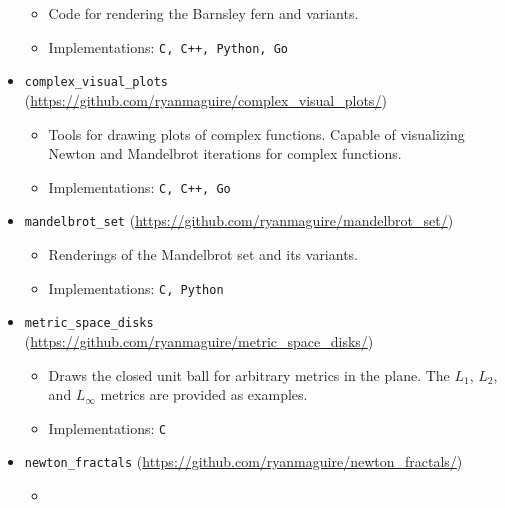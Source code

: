 \documentclass[a4paper,sans]{moderncv}
\begin{document}
\begin{itemize}
\begin{itemize}
                    \item
                        Code for rendering the Barnsley fern and variants.
                    \item
                        Implementations: \texttt{C, C++, Python, Go}
                \end{itemize}
            \item
                \texttt{complex\_visual\_plots}
                (\url{https://github.com/ryanmaguire/complex_visual_plots/})
                \begin{itemize}
                    \item
                        Tools for drawing plots of complex functions. Capable
                        of visualizing Newton and Mandelbrot iterations for
                        complex functions.
                    \item
                        Implementations: \texttt{C, C++, Go}
                \end{itemize}
            \item
                \texttt{mandelbrot\_set}
                (\url{https://github.com/ryanmaguire/mandelbrot_set/})
                \begin{itemize}
                    \item
                        Renderings of the Mandelbrot set and its variants.
                    \item
                        Implementations: \texttt{C, Python}
                \end{itemize}
            \item
                \texttt{metric\_space\_disks}
                (\url{https://github.com/ryanmaguire/metric_space_disks/})
                \begin{itemize}
                    \item
                        Draws the closed unit ball for arbitrary metrics in the
                        plane. The $L_{1}$, $L_{2}$, and $L_{\infty}$ metrics
                        are provided as examples.
                    \item
                        Implementations: \texttt{C}
                \end{itemize}
            \item
                \texttt{newton\_fractals}
                (\url{https://github.com/ryanmaguire/newton_fractals/})
                \begin{itemize}
                    \item

\end{itemize}
\end{itemize}
\end{document}
